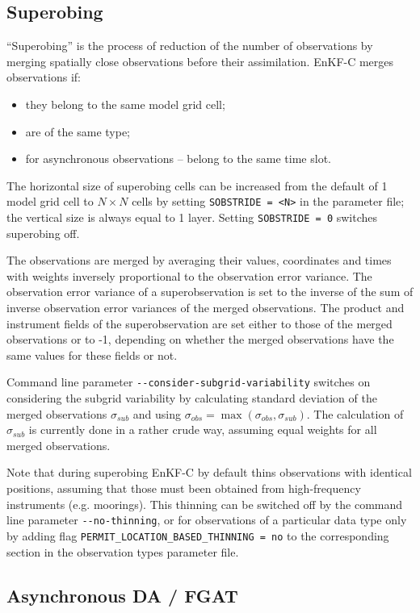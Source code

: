 \documentclass[11pt]{report}
\begin{document}
\subsection{Superobing}

``Superobing'' is the process of reduction of the number of observations by merging spatially close observations before their assimilation.
EnKF-C merges observations if:
\begin{itemize}
\item they belong to the same model grid cell;
\item are of the same type;
\item for asynchronous observations -- belong to the same time slot.
\end{itemize}
The horizontal size of superobing cells can be increased from the default of 1 model grid cell to $N \times N$ cells by setting \verb|SOBSTRIDE = <N>| in the parameter file; the vertical size is always equal to 1 layer.
Setting \verb|SOBSTRIDE = 0| switches superobing off.

The observations are merged by averaging their values, coordinates and times with weights inversely proportional to the observation error variance.
The observation error variance of a superobservation is set to the inverse of the sum of inverse observation error variances of the merged observations.
The product and instrument fields of the superobservation are set either to those of the merged observations or to -1, depending on whether the merged observations have the same values for these fields or not.

Command line parameter \verb|--consider-subgrid-variability| switches on considering the subgrid variability by calculating standard deviation of the merged observations $\sigma\!_{sub}$ and using $\sigma\!_{obs} = \max(\sigma\!_{obs}, \sigma\!_{sub})$.
The calculation of $\sigma\!_{sub}$ is currently done in a rather crude way, assuming equal weights for all merged observations.

Note that during superobing EnKF-C by default thins observations with identical positions, assuming that those must been obtained from high-frequency instruments (e.g. moorings).
This thinning can be switched off by the command line parameter \verb|--no-thinning|, or for observations of a particular data type only by adding flag \verb|PERMIT_LOCATION_BASED_THINNING = no| to the corresponding section in the observation types parameter file.

\subsection{Asynchronous DA / FGAT}
\label{sec:async}
\end{document}
